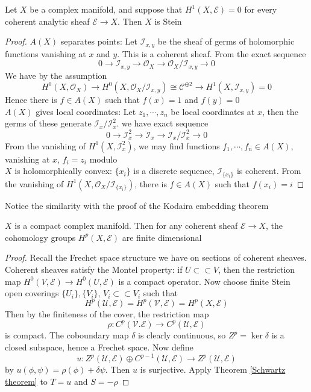 \documentclass[../main.tex]{subfiles}
\begin{document}
\begin{theorem}
Let $X$ be a complex manifold, and suppose that $H^1(X,\mathcal E)=0$ for every coherent analytic sheaf $\mathcal E\to X$. Then $X$ is Stein
\end{theorem}

\begin{proof}
$A(X)$ separates points: Let $\mathcal I_{x,y}$ be the sheaf of germs of holomorphic functions vanishing at $x$ and $y$. This is a coherent sheaf. From the exact sequence
\[0\to\mathcal I_{x,y}\to\mathcal O_X\to\mathcal O_X/\mathcal I_{x,y}\to0\]
We have by the assumption
\[H^0(X,\mathcal O_X)\to H^0(X,\mathcal O_X/\mathcal I_{x,y})\cong\mathcal C^{\oplus2}\to H^1(X,\mathcal I_{x,y})=0\]
Hence there is $f\in A(X)$ such that $f(x)=1$ and $f(y)=0$ \\
$A(X)$ gives local coordinates: Let $z_1,\cdots,z_n$ be local coordinates at $x$, then the germs of these generate $\mathcal I_x/\mathcal I_x^2$. we have exact sequence
\[0\to\mathcal I_x^2\to\mathcal I_x\to\mathcal I_x/\mathcal I_x^2\to0\]
From the vanishing of $H^1(X,\mathcal I_x^2)$, we may find functions $f_1,\cdots,f_n\in A(X)$, vanishing at $x$, $f_i=z_i$ modulo  \\
$X$ is holomorphically convex: $\{x_i\}$ is a discrete sequence, $\mathcal I_{\{x_i\}}$ is coherent. From the vanishing of $H^1(X,\mathcal O_X/\mathcal I_{\{x_i\}})$, there is $f\in A(X)$ such that $f(x_i)=i$
\end{proof}

\begin{remark}
Notice the similarity with the proof of the Kodaira embedding theorem
\end{remark}

\begin{theorem}
$X$ is a compact complex manifold. Then for any coherent sheaf $\mathcal E\to X$, the cohomology groups $H^p(X,\mathcal E)$ are finite dimensional
\end{theorem}

\begin{proof}
Recall the Frechet space structure we have on sections of coherent sheaves. Coherent sheaves satisfy the Montel property: if $U\subset\subset V$, then the restriction map $H^0(V,\mathcal E)\to H^0(U,\mathcal E)$ is a compact operator. Now choose finite Stein open coverings $\{U_i\},\{V_i\}$, $V_i\subset\subset V_i$ such that
\[H^p(\mathcal U,\mathcal E)=H^p(\mathcal V,\mathcal E)=H^p(X,\mathcal E)\]
Then by the finiteness of the cover, the restriction map
\[\rho:C^p(\mathcal V.\mathcal E)\to C^p(\mathcal U,\mathcal E)\]
is compact. The coboundary map $\delta$ is clearly continuous, so $Z^p=\ker\delta$ is a closed subspace, hence a Frechet space. Now define
\[u:Z^p(\mathcal U,\mathcal E)\oplus C^{p-1}(\mathcal U,\mathcal E)\to Z^p(\mathcal U,\mathcal E)\]
by $u(\phi,\psi)=\rho(\phi)+\delta\psi$. Then $u$ is surjective. Apply Theorem \ref{Schwartz theorem} to $T=u$ and $S=-\rho$
\end{proof}
\end{document}
